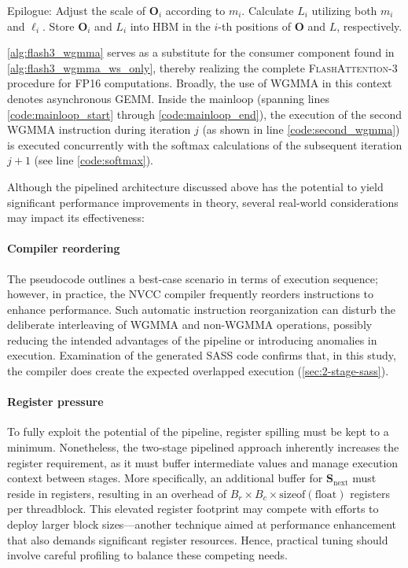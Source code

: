 \begin{enumerate}
\begin{algorithm}[H]
\begin{algorithmic}[1]
\STATE Epilogue: Adjust the scale of $\mathbf{O}_{i}$ according to $m_{i}$. Calculate $L_{i}$ utilizing both $m_{i}$ and $\ell_{i}$.
      Store $\mathbf{O}_{i}$ and $L_{i}$ into HBM in the $i$-th positions of $\mathbf{O}$ and $L$, respectively.
    \end{algorithmic}
  \end{algorithm}

\cref{alg:flash3_wgmma} serves as a substitute for the consumer component found in \cref{alg:flash3_wgmma_ws_only}, thereby realizing the complete \textsc{FlashAttention-3} procedure for FP16 computations. Broadly, the use of WGMMA in this context denotes asynchronous GEMM. Inside the mainloop (spanning lines \ref{code:mainloop_start} through \ref{code:mainloop_end}), the execution of the second WGMMA instruction during iteration $j$ (as shown in line \ref{code:second_wgmma}) is executed concurrently with the softmax calculations of the subsequent iteration $j+1$ (see line \ref{code:softmax}).

Although the pipelined architecture discussed above has the potential to yield significant performance improvements in theory, several real-world considerations may impact its effectiveness:
\paragraph{Compiler reordering} The pseudocode outlines a best-case scenario in terms of execution sequence; however, in practice, the NVCC compiler frequently reorders instructions to enhance performance. Such automatic instruction reorganization can disturb the deliberate interleaving of WGMMA and non-WGMMA operations, possibly reducing the intended advantages of the pipeline or introducing anomalies in execution. Examination of the generated SASS code confirms that, in this study, the compiler does create the expected overlapped execution (\cref{sec:2-stage-sass}).
\paragraph{Register pressure} To fully exploit the potential of the pipeline, register spilling must be kept to a minimum. Nonetheless, the two-stage pipelined approach inherently increases the register requirement, as it must buffer intermediate values and manage execution context between stages. More specifically, an additional buffer for $\mathbf{S}_{\mathrm{next}}$ must reside in registers, resulting in an overhead of $B_r \times B_c \times \text{sizeof}(\text{float})$ registers per threadblock. This elevated register footprint may compete with efforts to deploy larger block sizes—another technique aimed at performance enhancement that also demands significant register resources. Hence, practical tuning should involve careful profiling to balance these competing needs.

\end{enumerate}
